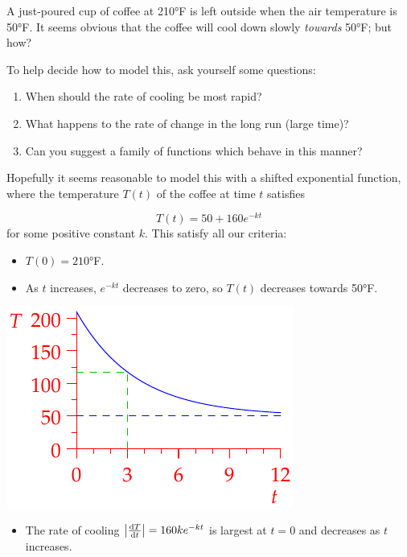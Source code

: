 
A just-poured cup of coffee at \ang{210}F is left outside when the air temperature is \ang{50}F. It seems obvious that the coffee will cool down slowly \emph{towards} \ang{50}F; but how?\smallbreak

To help decide how to model this, ask yourself some questions:

\begin{enumerate}%
  \item When should the rate of cooling be most rapid?
  \item What happens to the rate of change in the long run (large time)?
  \item Can you suggest a family of functions which behave in this manner?
\end{enumerate}


Hopefully it seems reasonable to model this with a shifted exponential function, where  the temperature $T(t)$ of the coffee at time $t$ satisfies\par
\begin{minipage}[t]{0.6\linewidth}\vspace{-8pt}
\[T(t)=50+160e^{-kt}\]
for some positive constant $k$. This satisfy all our criteria:
\begin{itemize}%
  \item $T(0)=\ang{210}$F.
  \item As $t$ increases, $e^{-kt}$ decreases to zero, so $T(t)$ decreases towards \ang{50}F.
\end{itemize}
\end{minipage}\hfill\begin{minipage}[t]{0.39\linewidth}\vspace{-15pt}
\hfill\includegraphics{coffee}
\end{minipage}\par
\begin{itemize}
  \item The rate of cooling $\smash[t]{\nm{\diff[T]{t}}}=160ke^{-kt}$ is largest at $t=0$ and decreases as $t$ increases. 
\end{itemize}

